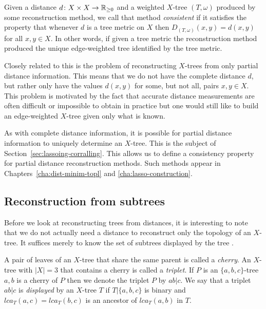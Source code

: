 Given a distance $d \colon X \times X \to {\mathbb R}_{\geq 0}$ and a weighted
$X$-tree $(T,\omega)$ produced by some reconstruction method, we call that
method \textit{consistent} if it satisfies the property that whenever $d$ is a
tree metric on $X$ then $D_{(T,\omega)}(x,y) = d(x,y)$ for all $x,y \in X$.
In other words, if given a tree metric the reconstruction method produced the
unique edge-weighted tree identified by the tree metric.

Closely related to this is the problem of reconstructing $X$-trees from only
partial distance information.  This means that we do not have the complete
distance $d$, but rather only have the values $d(x,y)$ for some, but not all,
pairs $x,y \in X$.  This problem is motivated by the fact that accurate
distance measurements are often difficult or impossible to obtain in practice
but one would still like to build an edge-weighted $X$-tree given only what is
known.

As with complete distance information, it is possible for partial distance
information to uniquely determine an $X$-tree.  This is the subject of
Section~\ref{sec:lassoing-corralling}.  This allows us to define a consistency
property for partial distance reconstruction methods.  Such methods appear in
Chapters~\ref{cha:dist-minim-topl} and \ref{cha:lasso-construction}.

\subsection{Reconstruction from subtrees}
\label{sec:constr-from-subtr}

Before we look at reconstructing trees from distances, it is interesting to
note that we do not actually need a distance to reconstruct only the topology
of an $X$-tree.  It suffices merely to know the set of subtrees displayed by
the tree \cite{semple2003phylogenetics}.

A pair of leaves of an $X$-tree that share the same parent is called a
\textit{cherry}.  An $X$-tree with $|X| = 3$ that contains a cherry is called
a \textit{triplet}.  If $P$ is an $\{a,b,c\}$-tree $a,b$ is a cherry of $P$
then we denote the triplet $P$ by $ab|c$.  We say that a triplet $ab|c$ is
\textit{displayed} by an $X$-tree $T$ if $T|\{a,b,c\}$ is binary and
$lca_T(a,c) = lca_T(b,c)$ is an ancestor of $lca_T(a,b)$ in $T$.

